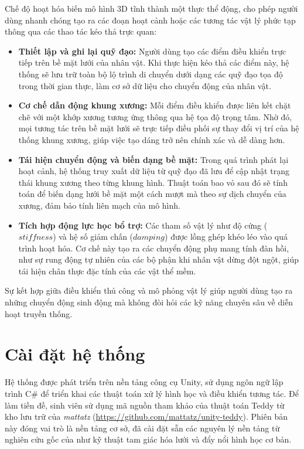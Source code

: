 \documentclass{report}
\begin{document}
Chế độ hoạt hóa biến mô hình 3D tĩnh thành một thực thể động, cho phép người dùng nhanh chóng tạo ra các đoạn hoạt cảnh hoặc các tương tác vật lý phức tạp thông qua các thao tác kéo thả trực quan:

\begin{itemize} 
    \item \textbf{Thiết lập và ghi lại quỹ đạo:} Người dùng tạo các điểm điều khiển trực tiếp trên bề mặt lưới của nhân vật. Khi thực hiện kéo thả các điểm này, hệ thống sẽ lưu trữ toàn bộ lộ trình di chuyển dưới dạng các quỹ đạo tọa độ trong thời gian thực, làm cơ sở dữ liệu cho chuyển động của nhân vật.
    
    \item \textbf{Cơ chế dẫn động khung xương:} Mỗi điểm điều khiển được liên kết chặt chẽ với một khớp xương tương ứng thông qua hệ tọa độ trọng tâm. Nhờ đó, mọi tương tác trên bề mặt lưới sẽ trực tiếp điều phối sự thay đổi vị trí của hệ thống khung xương, giúp việc tạo dáng trở nên chính xác và dễ dàng hơn.

    \item \textbf{Tái hiện chuyển động và biến dạng bề mặt:} Trong quá trình phát lại hoạt cảnh, hệ thống truy xuất dữ liệu từ quỹ đạo đã lưu để cập nhật trạng thái khung xương theo từng khung hình. Thuật toán bao vỏ sau đó sẽ tính toán để biến dạng lưới bề mặt một cách mượt mà theo sự dịch chuyển của xương, đảm bảo tính liên mạch của mô hình.

    \item \textbf{Tích hợp động lực học bổ trợ:} Các tham số vật lý như độ cứng ($stiffness$) và hệ số giảm chấn ($damping$) được lồng ghép khéo léo vào quá trình hoạt hóa. Cơ chế này tạo ra các chuyển động phụ mang tính đàn hồi, như sự rung động tự nhiên của các bộ phận khi nhân vật dừng đột ngột, giúp tái hiện chân thực đặc tính của các vật thể mềm.
\end{itemize}

Sự kết hợp giữa điều khiển thủ công và mô phỏng vật lý giúp người dùng tạo ra những chuyển động sinh động mà không đòi hỏi các kỹ năng chuyên sâu về diễn hoạt truyền thống.

\section{Cài đặt hệ thống}

Hệ thống được phát triển trên nền tảng công cụ Unity, sử dụng ngôn ngữ lập trình C\# để triển khai các thuật toán xử lý hình học và điều khiển tương tác. Để làm tiền đề, sinh viên sử dụng mã nguồn tham khảo của thuật toán Teddy từ kho lưu trữ của \textit{mattatz} (\url{https://github.com/mattatz/unity-teddy}). Phiên bản này đóng vai trò là nền tảng cơ sở, đã cài đặt sẵn các nguyên lý nền tảng từ nghiên cứu gốc của \cite{Igarashi1999} như kỹ thuật tam giác hóa lưới và đẩy nổi hình học cơ bản.
\end{document}
